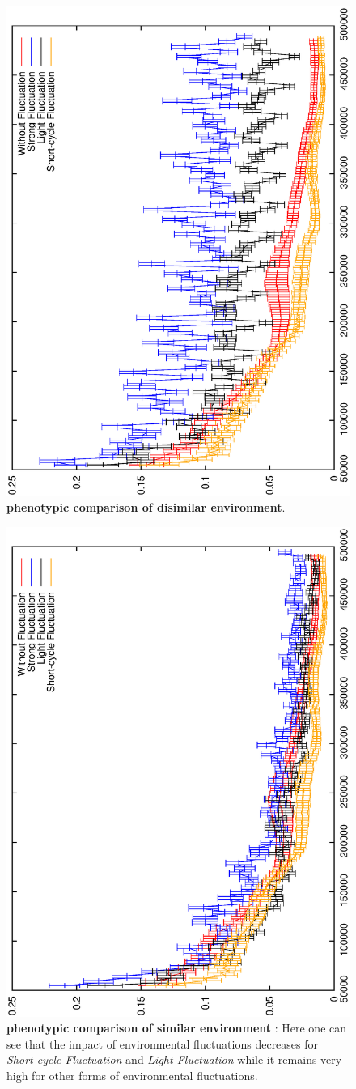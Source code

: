 \begin{figure}[h]
\centering
\includegraphics[width=0.7\columnwidth, angle =-90 ]{img/diffProp}
\caption{\textbf{phenotypic comparison of disimilar environment}.
}
\label{fig:disimilar}
\end{figure}

\begin{figure}[h]
\centering
\includegraphics[width=0.7\columnwidth, angle =-90 ]{img/ProgressProp}
\caption{\textbf{phenotypic comparison of similar environment} : Here one can see that the impact of environmental fluctuations decreases for \emph{Short-cycle  Fluctuation} and  \emph{Light  Fluctuation}  while it remains very high for other forms of environmental fluctuations.
}
\label{fig:similar}
\end{figure}

